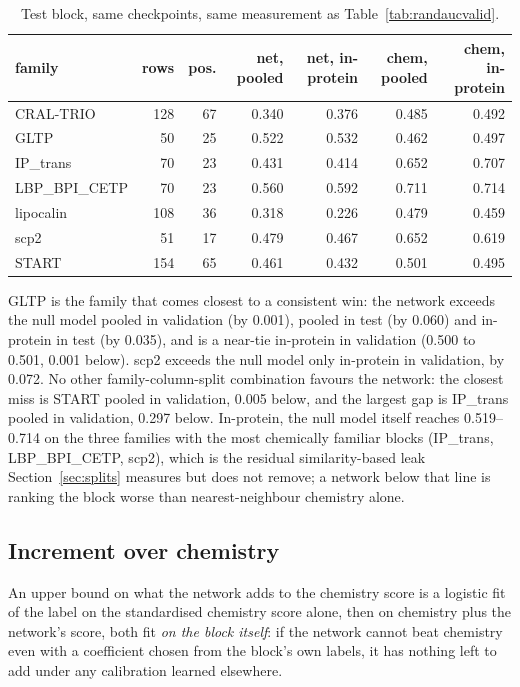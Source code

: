 \begin{table}[htbp]
\centering
\begin{tabular}{lrrrrrr}
\hline
family & rows & pos. & net, pooled & net, in-protein & chem, pooled & chem, in-protein \\
\hline
CRAL-TRIO & 128 & 67 & 0.340 & 0.376 & 0.485 & 0.492 \\
GLTP & 50 & 25 & 0.522 & 0.532 & 0.462 & 0.497 \\
IP\_trans & 70 & 23 & 0.431 & 0.414 & 0.652 & 0.707 \\
LBP\_BPI\_CETP & 70 & 23 & 0.560 & 0.592 & 0.711 & 0.714 \\
lipocalin & 108 & 36 & 0.318 & 0.226 & 0.479 & 0.459 \\
scp2 & 51 & 17 & 0.479 & 0.467 & 0.652 & 0.619 \\
START & 154 & 65 & 0.461 & 0.432 & 0.501 & 0.495 \\
\hline
\end{tabular}
\caption{Test block, same checkpoints, same measurement as Table~\ref{tab:randaucvalid}.}
\label{tab:randauctest}
\end{table}

GLTP is the family that comes closest to a consistent win: the network exceeds the null
model pooled in validation (by 0.001), pooled in test (by 0.060) and in-protein in test
(by 0.035), and is a near-tie in-protein in validation (0.500 to 0.501, 0.001 below).
scp2 exceeds the null model only in-protein in validation, by 0.072. No other
family-column-split combination favours the network: the closest miss is START pooled
in validation, 0.005 below, and the largest gap is IP\_trans pooled in validation, 0.297
below. In-protein, the null model itself reaches 0.519--0.714 on the three families with
the most chemically familiar blocks (IP\_trans, LBP\_BPI\_CETP, scp2), which is the
residual similarity-based leak Section~\ref{sec:splits} measures but does not remove; a
network below that line is ranking the block worse than nearest-neighbour chemistry
alone.

\subsection{Increment over chemistry}

An upper bound on what the network adds to the chemistry score is a logistic fit of the
label on the standardised chemistry score alone, then on chemistry plus the network's
score, both fit \emph{on the block itself}: if the network cannot beat chemistry even
with a coefficient chosen from the block's own labels, it has nothing left to add under
any calibration learned elsewhere.

